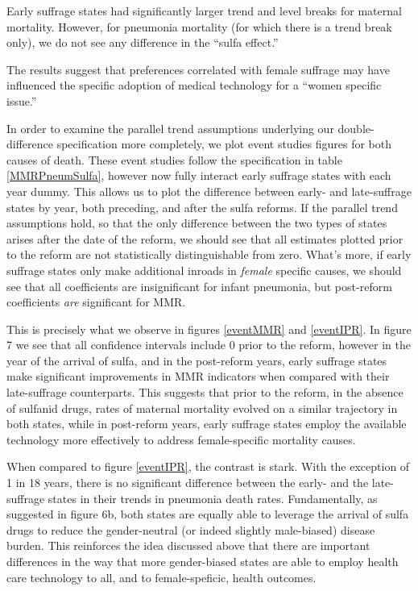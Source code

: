 \documentclass[11pt]{article}
\begin{document}
\begin{spacing}{1.4}
Early suffrage states had significantly larger trend and level breaks for maternal mortality. However, for pneumonia mortality (for which there is a trend break only), we do not see any difference in the ``sulfa effect.''

The results suggest that preferences correlated with female suffrage may have influenced the specific adoption of medical technology for a ``women specific issue.''


In order to examine the parallel trend assumptions underlying our double-difference specification more 
completely, we plot event studies figures for both causes of death.  These event studies follow the 
specification in table \ref{MMRPneumSulfa}, however now fully interact early suffrage states with each year dummy.  This 
allows us to plot the difference between early- and late-suffrage states by year, both preceding, and after 
the sulfa reforms.  If the parallel trend assumptions hold, so that the only difference between the two types
of states arises after the date of the reform, we should see that all estimates plotted prior to the reform 
are not statistically distinguishable from zero.  What's more, if early suffrage states only make additional 
inroads in \emph{female} specific causes, we should see that all coefficients are insignificant for infant 
pneumonia, but post-reform coefficients \emph{are} significant for MMR.

This is precisely what we observe in figures  \ref{eventMMR} and  \ref{eventIPR}.  In figure 7 we see that all confidence intervals
include 0 prior to the reform, however in the year of the arrival of sulfa, and in the post-reform years, 
early suffrage states make significant improvements in MMR indicators when compared with their 
late-suffrage counterparts.  This suggests that prior to the reform, in the absence of sulfanid drugs, 
rates of maternal mortality evolved on a similar trajectory in both states, while in post-reform years, early 
suffrage states employ the available technology more effectively to address female-specific mortality 
causes.

When compared to figure \ref{eventIPR}, the contrast is stark.  With the exception of 1 in 18 years, there is no 
significant difference between the early- and the late-suffrage states in their trends in pneumonia 
death rates.  Fundamentally, as suggested in figure 6b, both states are equally able to leverage the 
arrival of sulfa drugs to reduce the gender-neutral (or indeed slightly male-biased) disease burden. This 
reinforces the idea discussed above that there are important differences in the way that more 
gender-biased states are able to employ health care technology to all, and to female-speficic, health 
outcomes.



\end{spacing}
\end{document}
